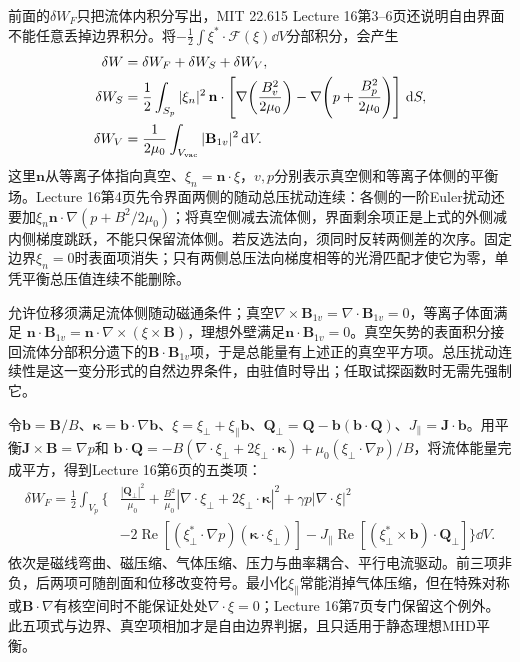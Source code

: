 前面的$\delta W_F$只把流体内积分写出，MIT 22.615 Lecture 16第3--6页还说明自由界面不能任意丢掉边界积分。将$-\frac12\int\xi^*\cdot\mathcal F(\xi)\dd V$分部积分，会产生
\begin{align}
\delta W&=\delta W_F+\delta W_S+\delta W_V,\nonumber\\
\delta W_S&=\frac12\int_{S_p}|\xi_n|^2\,\mathbf n\cdot
\left[\nabla\!\left(\frac{B_v^2}{2\mu_0}\right)
-\nabla\!\left(p+\frac{B_p^2}{2\mu_0}\right)\right]\,\mathrm d S,\label{eq:free-surface-jump}\\
\delta W_V&=\frac1{2\mu_0}\int_{V_{\rm vac}}|\mathbf B_{1v}|^2\,\mathrm d V .\nonumber
\end{align}
这里$\mathbf n$从等离子体指向真空、$\xi_n=\mathbf n\cdot\xi$，$v,p$分别表示真空侧和等离子体侧的平衡场。Lecture 16第4页先令界面两侧的随动总压扰动连续：各侧的一阶Euler扰动还要加$\xi_n\mathbf n\cdot\nabla(p+B^2/2\mu_0)$；将真空侧减去流体侧，界面剩余项正是上式的外侧减内侧梯度跳跃，不能只保留流体侧。若反选法向，须同时反转两侧差的次序。固定边界$\xi_n=0$时表面项消失；只有两侧总压法向梯度相等的光滑匹配才使它为零，单凭平衡总压值连续不能删除。

允许位移须满足流体侧随动磁通条件；真空$\nabla\times\mathbf B_{1v}=\nabla\cdot\mathbf B_{1v}=0$，等离子体面满足
$\mathbf n\cdot\mathbf B_{1v}=\mathbf n\cdot\nabla\times(\xi\times\mathbf B)$，理想外壁满足$\mathbf n\cdot\mathbf B_{1v}=0$。真空矢势的表面积分接回流体分部积分遗下的$\mathbf B\cdot\mathbf B_{1v}$项，于是总能量有上述正的真空平方项。总压扰动连续性是这一变分形式的自然边界条件，由驻值时导出；任取试探函数时无需先强制它。

令$\mathbf b=\mathbf B/B$、$\boldsymbol\kappa=\mathbf b\cdot\nabla\mathbf b$、$\xi=\xi_\perp+\xi_\parallel\mathbf b$、$\mathbf Q_\perp=\mathbf Q-\mathbf b(\mathbf b\cdot\mathbf Q)$、$J_\parallel=\mathbf J\cdot\mathbf b$。用平衡$\mathbf J\times\mathbf B=\nabla p$和
$\mathbf b\cdot\mathbf Q=-B(\nabla\cdot\xi_\perp+2\xi_\perp\cdot\boldsymbol\kappa)
+\mu_0(\xi_\perp\cdot\nabla p)/B$，将流体能量完成平方，得到Lecture 16第6页的五类项：
\begin{equation}
\begin{split}
\delta W_F=\frac12\int_{V_p}\Bigg\{&
\frac{|\mathbf Q_\perp|^2}{\mu_0}
+\frac{B^2}{\mu_0}\left|\nabla\cdot\xi_\perp
+2\xi_\perp\cdot\boldsymbol\kappa\right|^2
+\gamma p|\nabla\cdot\xi|^2\\
&-2\operatorname{Re}\!\left[
(\xi_\perp^*\cdot\nabla p)(\boldsymbol\kappa\cdot\xi_\perp)\right]
-J_\parallel\operatorname{Re}\!\left[
(\xi_\perp^*\times\mathbf b)\cdot\mathbf Q_\perp\right]\Bigg\}\dd V .
\end{split}
\end{equation}
依次是磁线弯曲、磁压缩、气体压缩、压力与曲率耦合、平行电流驱动。前三项非负，后两项可随剖面和位移改变符号。最小化$\xi_\parallel$常能消掉气体压缩，但在特殊对称或$\mathbf B\cdot\nabla$有核空间时不能保证处处$\nabla\cdot\xi=0$；Lecture 16第7页专门保留这个例外。此五项式与边界、真空项相加才是自由边界判据，且只适用于静态理想MHD平衡。
